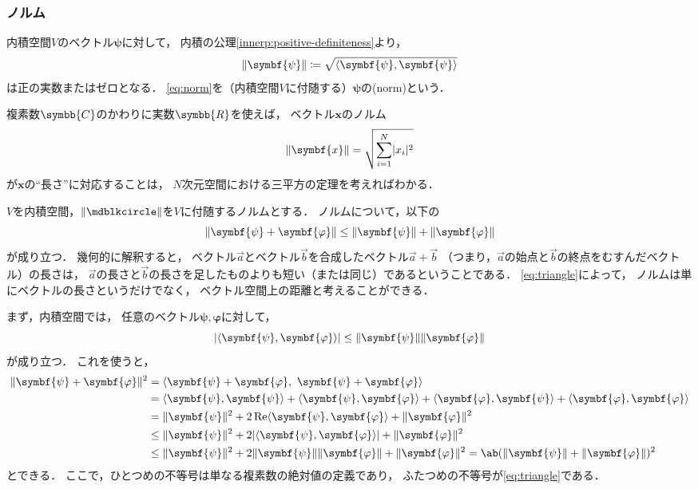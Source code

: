 \documentclass[
]{sotsu}
\newcommand{\bpsi}{\symbf{\psi}}
\newcommand{\bphi}{\symbf{\varphi}}
\begin{document}
\subsubsection{ノルム}
\label{sec:norm}

内積空間$V$のベクトル$\bpsi$に対して，
内積の公理\cref{innerp:positive-definiteness}より，
\begin{equation}
    \label{eq:norm}
    \norm{\bpsi} \coloneq \sqrt{\vphantom{\bpsi}\smash{\iparen{\bpsi, \bpsi}}}
\end{equation}
は正の実数またはゼロとなる．
\cref{eq:norm}を（内積空間$V$に付随する）$\bpsi$の(norm)という．

複素数$\symbb{C}$のかわりに実数$\symbb{R}$を使えば，
ベクトル$\symbf{x}$のノルム
\begin{equation*}
    \norm{\symbf{x}} = \sqrt{\sum_{i = 1}^{N} \abs{x_i}^2}
\end{equation*}
が$\symbf{x}$の``長さ''に対応することは，
$N$次元空間における三平方の定理を考えればわかる．

$V$を内積空間，$\norm{\bigdot}$を$V$に付随するノルムとする．
ノルムについて，以下の
\begin{equation}
    \label{eq:triangle}
    \norm{\bpsi + \bphi}
    \leq \norm{\bpsi} + \norm{\bphi}
\end{equation}
が成り立つ．
幾何的に解釈すると，
ベクトル$\vec{a}$とベクトル$\vec{b}$を合成したベクトル$\vec{a} + \vec{b}$
（つまり，$\vec{a}$の始点と$\vec{b}$の終点をむすんだベクトル）の長さは，
$\vec{a}$の長さと$\vec{b}$の長さを足したものよりも短い（または同じ）であるということである．
\cref{eq:triangle}によって，
ノルムは単にベクトルの長さというだけでなく，
ベクトル空間上の距離と考えることができる．

まず，内積空間では，
任意のベクトル$\bpsi, \bphi$に対して，
\begin{equation}
    \label{eq:Cauchy-Schwarz}
    \abs{\iparen{\bpsi, \bphi}} \leq \norm{\bpsi} \norm{\bphi}
\end{equation}
が成り立つ．
これを使うと，
\begin{equation*}
    \begin{split}
        \norm{\bpsi + \bphi}^2
        &= \iparen{\bpsi + \bphi, \  \bpsi + \bphi}
        \\
        &= \iparen{\bpsi, \bpsi}
            + \iparen{\bpsi, \bphi}
            + \iparen{\bphi, \bpsi}
            + \iparen{\bphi, \bphi}
        \\
        &= \norm{\bpsi}^2
            + 2 \Real \iparen{\bpsi, \bphi}
            + \norm{\bphi}^2
        \\
        &\leq \norm{\bpsi}^2 + 2 \abs{ \iparen{\bpsi, \bphi} } + \norm{\bphi}^2
        \\
        &\leq \norm{\bpsi}^2 + 2 \norm{\bpsi} \norm{\bphi} + \norm{\bphi}^2
        = \ab(\norm{\bpsi} + \norm{\bphi})^2
    \end{split}
\end{equation*}
とできる．
ここで，ひとつめの不等号は単なる複素数の絶対値の定義であり，
ふたつめの不等号が\cref{eq:triangle}である．
\end{document}

